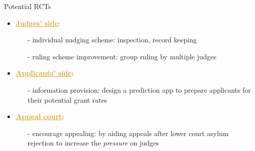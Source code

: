 \begin{frame}{Potential RCTs}
    \begin{itemize}
        \item<+-> \textcolor{goldenrod}{\textbf{\underline{Judges' side}}}:
        \begin{itemize}
            \item[-] individual nudging scheme: inspection, record keeping
            \item[-] ruling scheme improvement: group ruling by multiple judges
        \end{itemize}
        \item<+-> \textcolor{goldenrod}{\textbf{\underline{Applicants' side}}}:
        \begin{itemize}
            \item[-] information provision: design a prediction app to prepare applicants for their potential grant rates
        \end{itemize}
        \item<+-> \textcolor{goldenrod}{\textbf{\underline{Appeal court}}}:
        \begin{itemize}
            \item[-] encourage appealing: by aiding appeals after lower court asylum rejection to increase the \textit{pressure} on judges
        \end{itemize}
    \end{itemize}
\end{frame}
